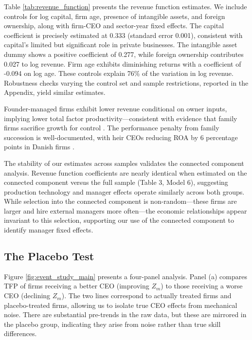 \documentclass[11pt,a4paper]{article}
\begin{document}
Table \ref{tab:revenue_function} presents the revenue function estimates. We include controls for log capital, firm age, presence of intangible assets, and foreign ownership, along with firm-CEO and sector-year fixed effects. The capital coefficient is precisely estimated at 0.333 (standard error 0.001), consistent with capital's limited but significant role in private businesses. The intangible asset dummy shows a positive coefficient of 0.277, while foreign ownership contributes 0.027 to log revenue. Firm age exhibits diminishing returns with a coefficient of -0.094 on log age. These controls explain 76\% of the variation in log revenue. Robustness checks varying the control set and sample restrictions, reported in the Appendix, yield similar estimates.

Founder-managed firms exhibit lower revenue conditional on owner inputs, implying lower total factor productivity—consistent with evidence that family firms sacrifice growth for control \citep{bennedsen2007inside}. The performance penalty from family succession is well-documented, with heir CEOs reducing ROA by 6 percentage points in Danish firms \citep{bennedsen2007family}. 



The stability of our estimates across samples validates the connected component analysis. Revenue function coefficients are nearly identical when estimated on the connected component versus the full sample (Table 3, Model 6), suggesting production technology and manager effects operate similarly across both groups. While selection into the connected component is non-random—these firms are larger and hire external managers more often—the economic relationships appear invariant to this selection, supporting our use of the connected component to identify manager fixed effects.

\subsection{The Placebo Test}

Figure \ref{fig:event_study_main} presents a four-panel analysis. Panel (a) compares TFP of firms receiving a better CEO (improving $Z_m$) to those receiving a worse CEO (declining $Z_m$). The two lines correspond to actually treated firms and placebo-treated firms, allowing us to isolate true CEO effects from mechanical noise. There are substantial pre-trends in the raw data, but these are mirrored in the placebo group, indicating they arise from noise rather than true skill differences.
\end{document}
